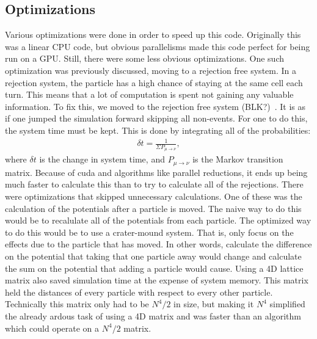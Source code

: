 \subsection{Optimizations}
Various optimizations were done in order to speed up this code. Originally this was a linear CPU code, but obvious parallelisms made this code perfect for being run on a GPU. Still, there were some less obvious optimizations. One such optimization was previously discussed, moving to a rejection free system. In a rejection system, the particle has a high chance of staying at the same cell each turn. This means that a lot of computation is spent not gaining any valuable information. To fix this, we moved to the rejection free system (BLK?)~\cite{Newman99}. It is as if one jumped the simulation forward skipping all non-events. For one to do this, the system time must be kept. This is done by integrating all of the probabilities:
\begin{eqnarray}
\delta t = \frac {1} {\Sigma P_{\mu \rightarrow \nu}},
\label{systemTime}
\end{eqnarray}
where $\delta t$ is the change in system time, and $P_{\mu \rightarrow \nu}$ is the Markov transition matrix. Because of {\sc cuda} and algorithms like parallel reductions, it ends up being much faster to calculate this than to try to calculate all of the rejections. There were optimizations that skipped unnecessary calculations. One of these was the calculation of the potentials after a particle is moved. The naive way to do this would be to recalulate all of the potentials from each particle. The optimized way to do this would be to use a crater-mound system. That is, only focus on the effects due to the particle that has moved. In other words, calculate the difference on the potential that taking that one particle away would change and calculate the sum on the potential that adding a particle would cause. Using a 4D lattice matrix also saved simulation time at the expense of system memory. This matrix held the distances of every particle with respect to every other particle. Technically this matrix only had to be $N^4/2$ in size, but making it $N^4$ simplified the already ardous task of using a 4D matrix and was faster than an algorithm which could operate on a $N^4/2$ matrix.

